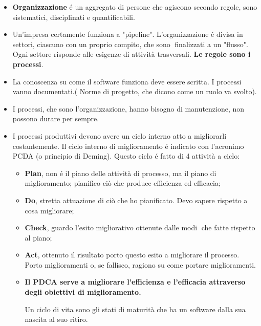 \documentclass[a4paper,10pt] {article}
\begin{document}
\begin{itemize}
	\item \textbf{Organizzazione} é un aggregato di persone che 
	agiscono secondo regole, sono sistematici, disciplinati e
	quantificabili. 
	
	\item Un'impresa certamente funziona a "pipeline". L'organizzazione é 
	divisa in settori, ciascuno con un proprio compito, che sono finalizzati a 
	un 
"flusso". Ogni settore risponde alle esigenze di attività 
	trasversali. \textbf{Le regole sono i processi}. 
	
	\item La conoscenza su come il software funziona deve essere scritta. I 
	processi vanno documentati.( Norme di progetto, che dicono come un ruolo va 
	svolto).

	\item I processi, che sono l'organizzazione, hanno bisogno di manutenzione, 
	non possono durare per sempre.
	 
	\item I processi produttivi devono avere un ciclo interno atto a 
	migliorarli 
	costantemente. Il ciclo interno di miglioramento é indicato con 
	l'acronimo 
	PCDA (o principio di Deming). 
	Questo ciclo é fatto di 4 attività a ciclo:
	\begin{itemize}
		\item \textbf{Plan}, non é il piano delle attività di processo, ma 
		il
		piano di miglioramento; pianifico ciò che produce
		efficienza ed efficacia;
		
		\item \textbf{Do}, stretta attuazione di ciò che ho pianificato. Devo 
		sapere rispetto a cosa migliorare;
		
		\item \textbf{Check}, guardo l'esito migliorativo ottenute dalle modi
		che fatte rispetto al piano;
		
		\item \textbf{Act}, ottenuto il risultato porto questo esito a 
		migliorare il processo. 
		Porto miglioramenti o, se fallisco, ragiono su come portare 
		miglioramenti.
		
		
		\item \textbf{Il PDCA serve a migliorare l'efficienza e l'efficacia 
		attraverso degli obiettivi di miglioramento.}
		
		Un ciclo di vita sono gli stati di maturità che ha un software dalla 
		sua nascita al suo ritiro.
		
	\end{itemize}


\end{itemize}
\end{document}
